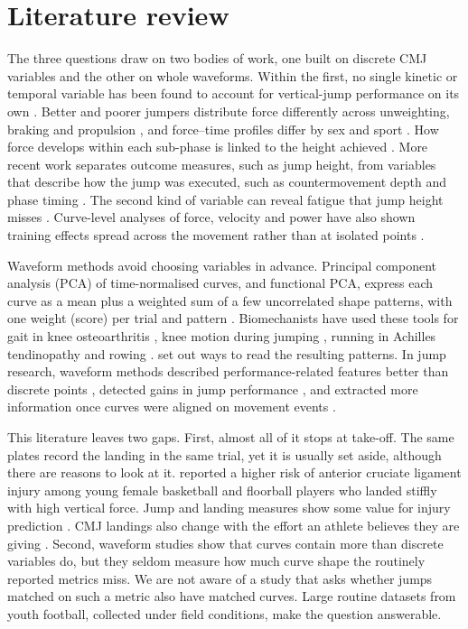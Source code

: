 \section{Literature review}
\label{sec:lit}

The three questions draw on two bodies of work, one built on discrete CMJ variables and the other on whole waveforms. Within the first, no single kinetic or temporal variable has been found to account for vertical-jump performance on its own \parencite{dowling1993}. Better and poorer jumpers distribute force differently across unweighting, braking and propulsion \parencite{sole2018}, and force--time profiles differ by sex and sport \parencite{laffaye2014}. How force develops within each sub-phase is linked to the height achieved \parencite{harry2018}. More recent work separates outcome measures, such as jump height, from variables that describe how the jump was executed, such as countermovement depth and phase timing \parencite{harry2024}. The second kind of variable can reveal fatigue that jump height misses \parencite{gathercole2015}. Curve-level analyses of force, velocity and power have also shown training effects spread across the movement rather than at isolated points \parencite{cormie2009}.

Waveform methods avoid choosing variables in advance. Principal component analysis (PCA) of time-normalised curves, and functional PCA, express each curve as a mean plus a weighted sum of a few uncorrelated shape patterns, with one weight (score) per trial and pattern \parencite{jolliffe2002,ramsay2005,jolliffe2016}. Biomechanists have used these tools for gait in knee osteoarthritis \parencite{deluzio2007}, knee motion during jumping \parencite{ryan2006}, running in Achilles tendinopathy \parencite{donoghue2008} and rowing \parencite{warmenhoven2019}. \textcite{brandon2013} set out ways to read the resulting patterns. In jump research, waveform methods described performance-related features better than discrete points \parencite{richter2014b}, detected gains in jump performance \parencite{floria2019}, and extracted more information once curves were aligned on movement events \parencite{richter2014a,moudy2018}.

This literature leaves two gaps. First, almost all of it stops at take-off. The same plates record the landing in the same trial, yet it is usually set aside, although there are reasons to look at it. \textcite{leppanen2017} reported a higher risk of anterior cruciate ligament injury among young female basketball and floorball players who landed stiffly with high vertical force. Jump and landing measures show some value for injury prediction \parencite{pedley2020}. CMJ landings also change with the effort an athlete believes they are giving \parencite{hite2025}. Second, waveform studies show that curves contain more than discrete variables do, but they seldom measure how much curve shape the routinely reported metrics miss. We are not aware of a study that asks whether jumps matched on such a metric also have matched curves. Large routine datasets from youth football, collected under field conditions, make the question answerable.

